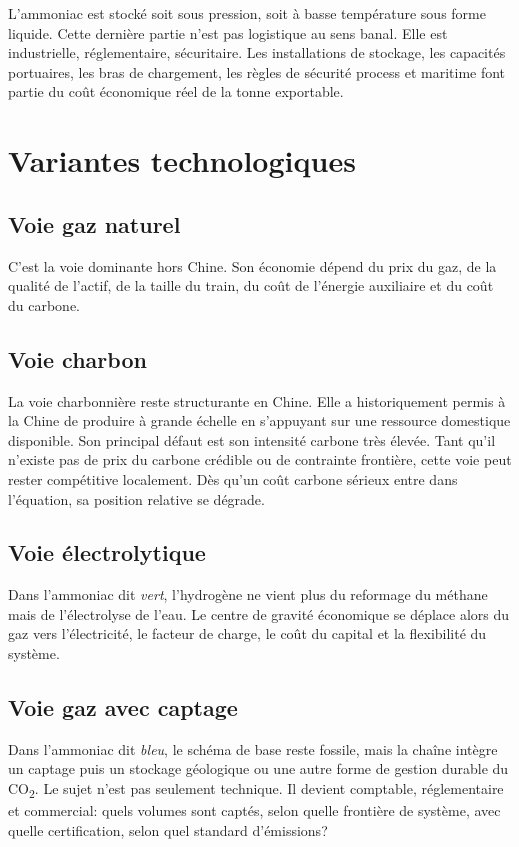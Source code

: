 \documentclass[11pt]{article}
\begin{document}
L'ammoniac est stocké soit sous pression, soit à basse température sous forme liquide. Cette dernière partie n'est pas logistique au sens banal. Elle est industrielle, réglementaire, sécuritaire. Les installations de stockage, les capacités portuaires, les bras de chargement, les règles de sécurité process et maritime font partie du coût économique réel de la tonne exportable.

\section{Variantes technologiques}

\subsection{Voie gaz naturel}

C'est la voie dominante hors Chine. Son économie dépend du prix du gaz, de la qualité de l'actif, de la taille du train, du coût de l'énergie auxiliaire et du coût du carbone.

\subsection{Voie charbon}

La voie charbonnière reste structurante en Chine. Elle a historiquement permis à la Chine de produire à grande échelle en s'appuyant sur une ressource domestique disponible. Son principal défaut est son intensité carbone très élevée. Tant qu'il n'existe pas de prix du carbone crédible ou de contrainte frontière, cette voie peut rester compétitive localement. Dès qu'un coût carbone sérieux entre dans l'équation, sa position relative se dégrade.

\subsection{Voie électrolytique}

Dans l'ammoniac dit \emph{vert}, l'hydrogène ne vient plus du reformage du méthane mais de l'électrolyse de l'eau. Le centre de gravité économique se déplace alors du gaz vers l'électricité, le facteur de charge, le coût du capital et la flexibilité du système.

\subsection{Voie gaz avec captage}

Dans l'ammoniac dit \emph{bleu}, le schéma de base reste fossile, mais la chaîne intègre un captage puis un stockage géologique ou une autre forme de gestion durable du CO\textsubscript{2}. Le sujet n'est pas seulement technique. Il devient comptable, réglementaire et commercial: quels volumes sont captés, selon quelle frontière de système, avec quelle certification, selon quel standard d'émissions?
\end{document}
